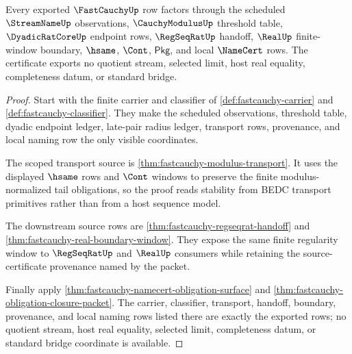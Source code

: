 \begin{theorem}
\label{thm:fastcauchy-scoped-dependency-certificate}
Every exported $\FastCauchyUp$ row factors through the scheduled
$\StreamNameUp$ observations, $\CauchyModulusUp$ threshold table,
$\DyadicRatCoreUp$ endpoint rows, $\RegSeqRatUp$ handoff, $\RealUp$
finite-window boundary, $\hsame$, $\Cont$, $\mathsf{Pkg}$, and local
$\NameCert$ rows. The certificate exports no quotient stream, selected limit,
host real equality, completeness datum, or standard bridge.
\end{theorem}
\begin{proof}
Start with the finite carrier and classifier of
\autoref{def:fastcauchy-carrier} and \autoref{def:fastcauchy-classifier}. They
make the scheduled observations, threshold table, dyadic endpoint ledger,
late-pair radius ledger, transport rows, provenance, and local naming row the
only visible coordinates.

The scoped transport source is
\autoref{thm:fastcauchy-modulus-transport}. It uses the displayed $\hsame$
rows and $\Cont$ windows to preserve the finite modulus-normalized tail
obligations, so the proof reads stability from BEDC transport primitives rather
than from a host sequence model.

The downstream source rows are
\autoref{thm:fastcauchy-regseqrat-handoff} and
\autoref{thm:fastcauchy-real-boundary-window}. They expose the same finite
regularity window to $\RegSeqRatUp$ and $\RealUp$ consumers while retaining the
source-certificate provenance named by the packet.

Finally apply \autoref{thm:fastcauchy-namecert-obligation-surface} and
\autoref{thm:fastcauchy-obligation-closure-packet}. The carrier, classifier,
transport, handoff, boundary, provenance, and local naming rows listed there
are exactly the exported rows; no quotient stream, host real equality, selected
limit, completeness datum, or standard bridge coordinate is available.
\end{proof}

